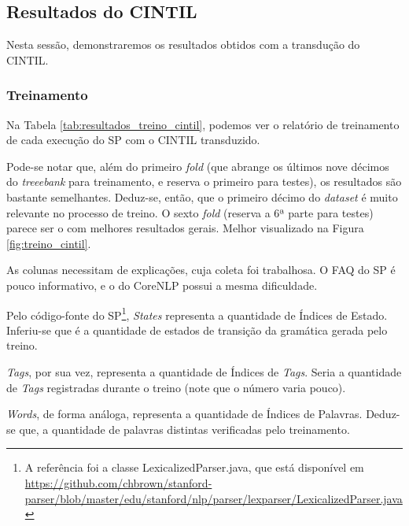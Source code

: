 \subsection{Resultados do CINTIL}
\label{subsec:resultados_cintil}
Nesta sessão, demonstraremos os resultados obtidos com a transdução do CINTIL.

\subsubsection{Treinamento} 
\label{subsubsec:result_treino_cintil}

Na Tabela \ref{tab:resultados_treino_cintil}, podemos ver o relatório de treinamento de cada execução do SP com o CINTIL transduzido.
\begin{center}
    
\end{center}

Pode-se notar que, além do primeiro \textit{fold} (que abrange os últimos nove décimos do \textit{treeebank} para treinamento, e reserva o primeiro para testes), os resultados são bastante semelhantes. Deduz-se, então, que o primeiro décimo do \textit{dataset} é muito relevante no processo de treino. O sexto \textit{fold} (reserva a 6ª parte para testes) parece ser o com melhores resultados gerais. 
Melhor visualizado na Figura \ref{fig:treino_cintil}.
\begin{center}
    
\end{center}

As colunas necessitam de explicações, cuja coleta foi trabalhosa. O FAQ do SP é pouco informativo, e o do CoreNLP possui a mesma dificuldade.

Pelo código-fonte do SP\footnote{A referência foi a classe LexicalizedParser.java, que está disponível em \url{https://github.com/chbrown/stanford-parser/blob/master/edu/stanford/nlp/parser/lexparser/LexicalizedParser.java}}, \textit{States} representa a quantidade de Índices de Estado. Inferiu-se que é a quantidade de estados de transição da gramática gerada pelo treino. 

\textit{Tags}, por sua vez, representa a quantidade de Índices de \textit{Tags}. Seria a quantidade de \textit{Tags} registradas durante o treino (note que o número varia pouco).

\textit{Words}, de forma análoga, representa a quantidade de Índices de Palavras. Deduz-se que, a quantidade de palavras distintas verificadas pelo treinamento.

